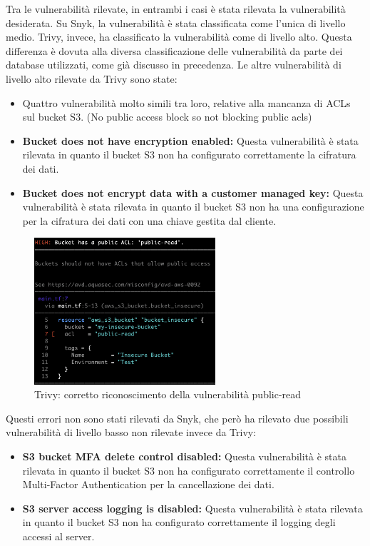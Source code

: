 Tra le vulnerabilità rilevate, in entrambi i casi è stata rilevata la vulnerabilità desiderata. Su Snyk, la vulnerabilità è stata classificata come l'unica di livello medio. Trivy, invece, ha classificato la vulnerabilità come di livello alto. Questa differenza è dovuta alla diversa classificazione delle vulnerabilità da parte dei database utilizzati, come già discusso in precedenza.
Le altre vulnerabilità di livello alto rilevate da Trivy sono state:
\begin{itemize}
   \item Quattro vulnerabilità molto simili tra loro, relative alla mancanza di ACLs sul bucket S3. (No public access block so not blocking public acls)
   \item \textbf{Bucket does not have encryption enabled:} Questa vulnerabilità è stata rilevata in quanto il bucket S3 non ha configurato correttamente la cifratura dei dati.
   \item \textbf{Bucket does not encrypt data with a customer managed key:} Questa vulnerabilità è stata rilevata in quanto il bucket S3 non ha una configurazione per la cifratura dei dati con una chiave gestita dal cliente.

\end{itemize}

\begin{figure}[H]
   \centering
   \includegraphics[width=0.6\textwidth]{immagini/capitolo2/trivy_iac.png}
   \caption{Trivy: corretto riconoscimento della vulnerabilità public-read}
   \label{fig:trivy_iac}
\end{figure}

Questi errori non sono stati rilevati da Snyk, che però ha rilevato due possibili vulnerabilità di livello basso non rilevate invece da Trivy:
\begin{itemize}
   \item \textbf{S3 bucket MFA delete control disabled:} Questa vulnerabilità è stata rilevata in quanto il bucket S3 non ha configurato correttamente il controllo Multi-Factor Authentication per la cancellazione dei dati.
   \item \textbf{S3 server access logging is disabled:} Questa vulnerabilità è stata rilevata in quanto il bucket S3 non ha configurato correttamente il logging degli accessi al server.

\end{itemize}


